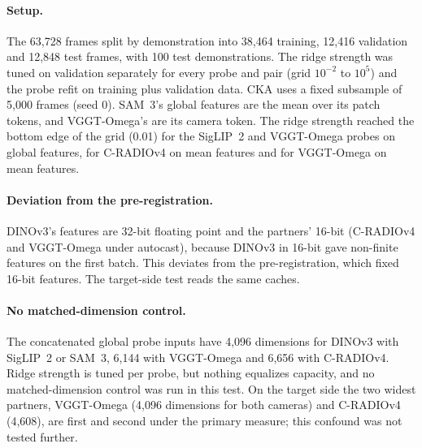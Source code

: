 \paragraph{Setup.}
The 63,728 frames split by demonstration into 38,464 training, 12,416 validation and 12,848 test frames, with 100 test demonstrations.
The ridge strength was tuned on validation separately for every probe and pair (grid $10^{-2}$ to $10^{5}$) and the probe refit on training plus validation data.
CKA uses a fixed subsample of 5,000 frames (seed 0).
SAM~3's global features are the mean over its patch tokens, and VGGT-Omega's are its camera token.
The ridge strength reached the bottom edge of the grid (0.01) for the SigLIP~2 and VGGT-Omega probes on global features, for C-RADIOv4 on mean features and for VGGT-Omega on mean features.

\paragraph{Deviation from the pre-registration.}
DINOv3's features are 32-bit floating point and the partners' 16-bit (C-RADIOv4 and VGGT-Omega under autocast), because DINOv3 in 16-bit gave non-finite features on the first batch.
This deviates from the pre-registration, which fixed 16-bit features.
The target-side test reads the same caches.

\paragraph{No matched-dimension control.}
The concatenated global probe inputs have 4,096 dimensions for DINOv3 with SigLIP~2 or SAM~3, 6,144 with VGGT-Omega and 6,656 with C-RADIOv4.
Ridge strength is tuned per probe, but nothing equalizes capacity, and no matched-dimension control was run in this test.
On the target side the two widest partners, VGGT-Omega (4,096 dimensions for both cameras) and C-RADIOv4 (4,608), are first and second under the primary measure; this confound was not tested further.

